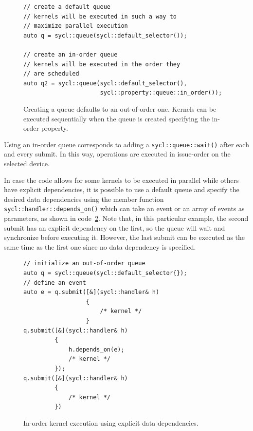 \begin{figure}[ht!]
\renewcommand{\figurename}{Code}
\begin{verbatim}
// create a default queue
// kernels will be executed in such a way to 
// maximize parallel execution
auto q = sycl::queue(sycl::default_selector());

// create an in-order queue
// kernels will be executed in the order they
// are scheduled
auto q2 = sycl::queue(sycl::default_selector(),
                      sycl::property::queue::in_order());
\end{verbatim}
\caption{Creating a queue defaults to an out-of-order one. Kernels can be executed sequentially when the queue is created specifying the in-order property.}
\label{code:in_order_queue}
\end{figure}

Using an in-order queue corresponds to adding a \Verb "sycl::queue::wait()" after each and every submit. In this way, operations are executed in issue-order on the selected device.

In case the code allows for some kernels to be executed in parallel while others have explicit dependencies, it is possible to use a default queue and specify the desired data dependencies using the member function \Verb "sycl::handler::depends_on()" which can take an event or an array of events as parameters, as shown in code~\ref{code:depens_on}. Note that, in this particular example, the second submit has an explicit dependency on the first, so the queue will wait and synchronize before executing it. However, the last submit can be executed as the same time as the first one since no data dependency is specified.

\begin{figure}[ht!]
\renewcommand{\figurename}{Code}
\begin{verbatim}
// initialize an out-of-order queue
auto q = sycl::queue(sycl::default_selector{});
// define an event
auto e = q.submit([&](sycl::handler& h)
                  {
                      /* kernel */
                  }
q.submit([&](sycl::handler& h)
         {
             h.depends_on(e);
             /* kernel */
         });
q.submit([&](sycl::handler& h)
         {
             /* kernel */
         })
\end{verbatim}
\caption{In-order kernel execution using explicit data dependencies.}
\label{code:depens_on}
\end{figure}